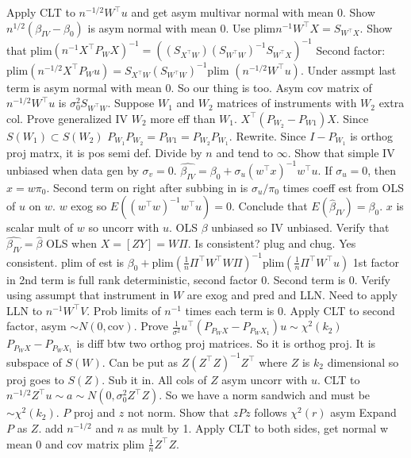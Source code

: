 \Q Apply CLT to $n^{-1/2}W^{\top}u$ and get asym multivar normal with mean 0.
Show $n^{1/2} (\beta_{IV} - \beta_0)$ is asym normal with mean 0.
\A Use plim$n^{-1} W^{\top}X = S_{W^{\top}X}$.
Show that plim$(n^{-1} X^{\top} P_W X)^{-1} = ((S_{X^{\top} W}) (S_{W^{\top}W})^{-1} S_{W^{\top} X})^{-1}$
Second factor: plim$(n^{-1/2} X^{\top} P_W u) = S_{X^{\top} W }(S_{W^{\top} W})^{-1} $plim $(n^{-1/2}W^{\top} u)$.
Under assmpt last term is asym normal with mean 0.
So our thing is too.
Asym cov matrix of $n^{-1/2}W^{\top} u$ is $\sigma_0 ^2 S_{W^{\top} W}$.
\Q Suppose $W_1$ and $W_2$ matrices of instruments with $W_2$ extra col.
Prove generalized IV $W_2$ more eff than $W_1$.
\A $X^{\top} (P_{W_2} - P_{W1} )X $.
Since $S(W_1) \subset S(W_2)$ $P_{W_1}P_{W_2} = P_{W1} = P_{W_2}P_{W_1}$.
Rewrite.
Since $I - P_{W_1}$ is orthog proj matrx, it is pos semi def.
Divide by $n$ and tend to $\infty$.
\Q Show that simple IV unbiased when data gen by $\sigma_v = 0$.
\A $\hat{\beta_{IV}} = \beta_0 + \sigma_u (w^{\top} x)^{-1} w^{\top} u$.
If $\sigma_u = 0$, then $x = w\pi_0$.
Second term on right after subbing in is $\sigma_u / \pi_0$ times coeff est from OLS of $u$ on $w$.
$w$ exog so $E((w^{\top}w)^{-1} w^{\top}u) = 0$.
Conclude that $E(\hat{\beta}_{IV}) = \beta_0$.
$x$ is scalar mult of $w$ so uncorr with $u$.
OLS $\beta$ unbiased so IV unbiased.
\Q Verify that $\hat{\beta_{IV}} = \hat{\beta}$ OLS when $X = [ZY] = W \Pi$.
Is consistent?
\A plug and chug.
Yes consistent.
plim of est is $\beta_0 + \text{plim}(\frac{1}{n}\Pi ^{\top} W^{\top} W \Pi )^{-1} \text{plim}(\frac{1}{n}\Pi ^{\top} W^{\top} u )$
1st factor in 2nd term is full rank deterministic, second factor 0.
Second term is 0.
\Q Verify using assumpt that instrument in $W$ are exog and pred and LLN.
\A Need to apply LLN to $n^{-1}W^{\top}V$.
Prob limits of $n^{-1}$ times each term is 0.
Apply CLT to second factor, asym $\sim N(0, \text{cov})$.
\Q Prove $\frac{1}{\sigma^2} u^{\top} (P_{P_{W}X} - P_{P_W X_1})u \sim \chi^2 (k_2)$
\A $P_{P_{W}X} - P_{P_W X_1}$ is diff btw two orthog proj matrices.
So it is orthog proj.
It is subspace of $S(W)$.
Can be put as $Z(Z^{\top}Z)^{-1}Z^{\top}$ where $Z$ is $k_2$ dimensional so proj goes to $S(Z)$.
Sub it in.
All cols of $Z$ asym uncorr with $u$.
CLT to $n^{-1/2} Z^{\top} u \sim a \sim N(0,\sigma_0 ^2 Z^{\top} Z)$.
So we have a norm sandwich and must be $\sim \chi^2 (k_2)$.
\Q $P$ proj and $z$ not norm.
Show that $zPz$ follows $\chi^2 (r)$ asym
\A Expand $P$ as $Z$.
add $n^{-1/2}$ and $n$ as mult by 1.
Apply CLT to both sides, get normal w mean 0 and cov matrix plim $\frac{1}{n}Z^{\top}Z$.





